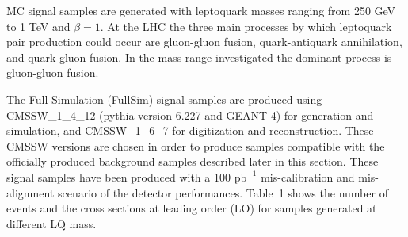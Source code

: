 
MC signal samples are generated with leptoquark masses ranging from 250 GeV to 1 TeV and $\beta=1$. 
At the LHC the three main processes by which leptoquark pair production could occur are gluon-gluon fusion, 
quark-antiquark annihilation, and quark-gluon fusion. In the mass range investigated the dominant process is gluon-gluon fusion. 

The Full Simulation (FullSim) signal samples are produced using 
CMSSW\_1\_4\_12 (pythia version 6.227 and GEANT 4) 
for generation and simulation, and CMSSW\_1\_6\_7  for digitization and reconstruction. 
These CMSSW versions are chosen in order to produce samples
compatible with the officially produced background samples described later in this section. 
These signal samples have been produced with a 100 $\mbox{pb}^{-1}$ mis-calibration and mis-alignment 
scenario of the detector performances. Table~1
shows the number of events and the cross sections at leading order (LO) for samples generated at different LQ mass.

